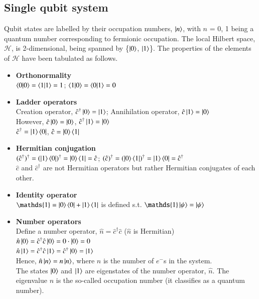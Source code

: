 \documentclass{resonance}
\begin{document}
\subsection{Single qubit system}
Qubit states are labelled by their occupation numbers, $\ket{n}$, with $n$ = 0, 1 being a quantum number corresponding to fermionic occupation. The local Hilbert space, $\mathcal{H}$, is 2-dimensional, being spanned by \{$\ket{0}$, $\ket{1}$\}. The properties of the elements of $\mathcal{H}$ have been tabulated as follows.
\begin{itemize}
    \item \textbf{Orthonormality}\\
    $\braket{0|0} = \braket{1|1} = 1$; $\braket{1|0} = \braket{0|1} = 0$
    
    \item \textbf{Ladder operators}\\
    Creation operator, $\hat{c}^{\dagger} \ket{0} = \ket{1}$; Annihilation operator, $\hat{c}\ket{1} = \ket{0}$\\
    However, $\hat{c} \ket{0} = \ket{0}$, $\hat{c}^{\dagger} \ket{1} = \ket{0}$\\
    $\hat{c}^{\dagger} = \ket{1}\bra{0}$, $\hat{c} = \ket{0}\bra{1}$

    \item \textbf{Hermitian conjugation}\\
    $(\hat{c}^{\dagger})^{\dagger} = (\ket{1}\bra{0})^{\dagger} = \ket{0}\bra{1} = \hat{c}$; $(\hat{c})^{\dagger} = (\ket{0}\bra{1})^{\dagger} = \ket{1}\bra{0} = \hat{c}^{\dagger}$\\
    $\hat{c}$ and $\hat{c}^{\dagger}$ are not Hermitian operators but rather Hermitian conjugates of each other.

    \item \textbf{Identity operator}\\
    $\mathds{1} = \ket{0}\bra{0} + \ket{1}\bra{1}$ is defined s.t. $\mathds{1}\ket{\psi} = \ket{\psi}$

    \item \textbf{Number operators}\\
    Define a number operator, $\hat{n} = \hat{c}^{\dagger} \hat{c}$ ($\hat{n}$ is Hermitian) \\
    $\hat{n}\ket{0} = \hat{c}^{\dagger} \hat{c} \ket{0} = 0 \cdot \ket{0} = 0$\\
    $\hat{n}\ket{1} = \hat{c}^{\dagger} \hat{c} \ket{1} =  \hat{c}^{\dagger} \ket{0} = \ket{1}$\\
    Hence, $\hat{n}\ket{n} = n\ket{n}$, where $n$ is the number of $e^{-}$s in the system. \\
    The states $\ket{0}$ and $\ket{1}$ are eigenstates of the number operator, $\hat{n}$. The eigenvalue $n$ is the so-called occupation number (it classifies as a quantum number).


\end{itemize}
\end{document}
